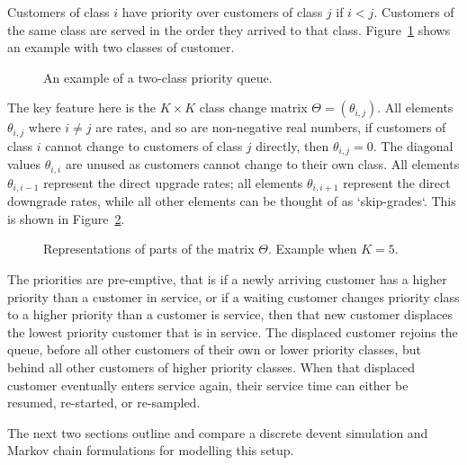 \documentclass{article}
\begin{document}
Customers of class $i$ have priority over customers of class $j$ if $i < j$.
Customers of the same class are served in the order they arrived to that class.
Figure~\ref{fig:twoclass_example} shows an example with two classes of customer.

\begin{figure}
\begin{center}

\end{center}
\caption{An example of a two-class priority queue.}
\label{fig:twoclass_example}
\end{figure}

The key feature here is the $K \times K$ class change matrix
$\Theta = (\theta_{i,j})$. All elements $\theta_{i,j}$ where $i \neq j$ are
rates, and so are non-negative real numbers, if customers of class $i$ cannot
change to customers of class $j$ directly, then $\theta_{i,j} = 0$. The diagonal
values $\theta_{i,i}$ are unused as customers cannot change to their own class.
All elements $\theta_{i,i-1}$ represent the direct upgrade rates; all elements
$\theta_{i,i+1}$ represent the direct downgrade rates, while all other elements
can be thought of as `skip-grades`.
This is shown in Figure~\ref{fig:skipgrades}.

\begin{figure}
\begin{center}

\end{center}
\caption{Representations of parts of the matrix $\Theta$. Example when $K=5$.}
\label{fig:skipgrades}
\end{figure}

The priorities are pre-emptive, that is if a newly arriving customer has a
higher priority than a customer in service, or if a waiting customer changes
priority class to a higher priority than a customer is service, then that new
customer displaces the lowest priority customer that is in service. The
displaced customer rejoins the queue, before all other customers of their own or
lower priority classes, but behind all other customers of higher priority
classes. When that displaced customer eventually enters service again, their
service time can either be resumed, re-started, or re-sampled.

The next two sections outline and compare a discrete devent simulation and
Markov chain formulations for modelling this setup.
\end{document}
